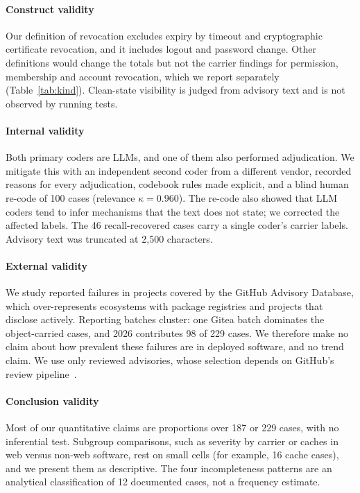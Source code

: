 \documentclass[preprint,12pt]{elsarticle}
\begin{document}
\paragraph{Construct validity}
Our definition of revocation excludes expiry by timeout and cryptographic certificate revocation, and it includes
logout and password change. Other definitions would change the totals but not the carrier findings for
permission, membership and account revocation, which we report separately (Table~\ref{tab:kind}). Clean-state
visibility is judged from advisory text and is not observed by running tests.

\paragraph{Internal validity}
Both primary coders are LLMs, and one of them also performed adjudication. We mitigate this with an independent
second coder from a different vendor, recorded reasons for every adjudication, codebook rules made explicit,
and a blind human re-code of 100 cases (relevance $\kappa=0.960$). The re-code also showed that LLM
coders tend to infer mechanisms that the text does not state; we corrected the affected labels. The 46 recall-recovered cases carry a single coder's
carrier labels. Advisory text was truncated at 2{,}500 characters.

\paragraph{External validity}
We study reported failures in projects covered by the GitHub Advisory Database, which over-represents
ecosystems with package registries and projects that disclose actively. Reporting batches cluster: one Gitea
batch dominates the object-carried cases, and 2026 contributes 98 of 229 cases. We therefore make no claim about how prevalent
these failures are in deployed software, and no trend claim.
We use only reviewed advisories, whose selection depends on GitHub's review pipeline~\cite{segal2026ghsareview}.

\paragraph{Conclusion validity}
Most of our quantitative claims are proportions over 187 or 229 cases, with no inferential test. Subgroup comparisons,
such as severity by carrier or caches in web versus non-web software, rest on small cells (for example, 16 cache cases), and
we present them as descriptive. The four incompleteness patterns are an analytical
classification of 12 documented cases, not a frequency estimate.
\end{document}
